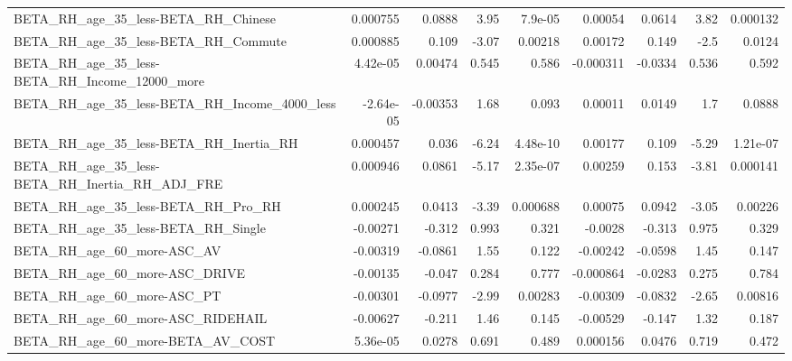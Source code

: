 \begin{tabular}{lrrrrrrrr}
BETA\_RH\_age\_35\_less-BETA\_RH\_Chinese                &    0.000755 &       0.0888 &     3.95 &  7.9e-05 &    0.00054 &      0.0614 &         3.82 &      0.000132 \\
BETA\_RH\_age\_35\_less-BETA\_RH\_Commute                &    0.000885 &        0.109 &    -3.07 &  0.00218 &    0.00172 &       0.149 &         -2.5 &        0.0124 \\
BETA\_RH\_age\_35\_less-BETA\_RH\_Income\_12000\_more      &    4.42e-05 &      0.00474 &    0.545 &    0.586 &  -0.000311 &     -0.0334 &        0.536 &         0.592 \\
BETA\_RH\_age\_35\_less-BETA\_RH\_Income\_4000\_less       &   -2.64e-05 &     -0.00353 &     1.68 &    0.093 &    0.00011 &      0.0149 &          1.7 &        0.0888 \\
BETA\_RH\_age\_35\_less-BETA\_RH\_Inertia\_RH             &    0.000457 &        0.036 &    -6.24 & 4.48e-10 &    0.00177 &       0.109 &        -5.29 &      1.21e-07 \\
BETA\_RH\_age\_35\_less-BETA\_RH\_Inertia\_RH\_ADJ\_FRE     &    0.000946 &       0.0861 &    -5.17 & 2.35e-07 &    0.00259 &       0.153 &        -3.81 &      0.000141 \\
BETA\_RH\_age\_35\_less-BETA\_RH\_Pro\_RH                 &    0.000245 &       0.0413 &    -3.39 & 0.000688 &    0.00075 &      0.0942 &        -3.05 &       0.00226 \\
BETA\_RH\_age\_35\_less-BETA\_RH\_Single                 &    -0.00271 &       -0.312 &    0.993 &    0.321 &    -0.0028 &      -0.313 &        0.975 &         0.329 \\
BETA\_RH\_age\_60\_more-ASC\_AV                         &    -0.00319 &      -0.0861 &     1.55 &    0.122 &   -0.00242 &     -0.0598 &         1.45 &         0.147 \\
BETA\_RH\_age\_60\_more-ASC\_DRIVE                      &    -0.00135 &       -0.047 &    0.284 &    0.777 &  -0.000864 &     -0.0283 &        0.275 &         0.784 \\
BETA\_RH\_age\_60\_more-ASC\_PT                         &    -0.00301 &      -0.0977 &    -2.99 &  0.00283 &   -0.00309 &     -0.0832 &        -2.65 &       0.00816 \\
BETA\_RH\_age\_60\_more-ASC\_RIDEHAIL                   &    -0.00627 &       -0.211 &     1.46 &    0.145 &   -0.00529 &      -0.147 &         1.32 &         0.187 \\
BETA\_RH\_age\_60\_more-BETA\_AV\_COST                   &    5.36e-05 &       0.0278 &    0.691 &    0.489 &   0.000156 &      0.0476 &        0.719 &         0.472 \\

\end{tabular}
